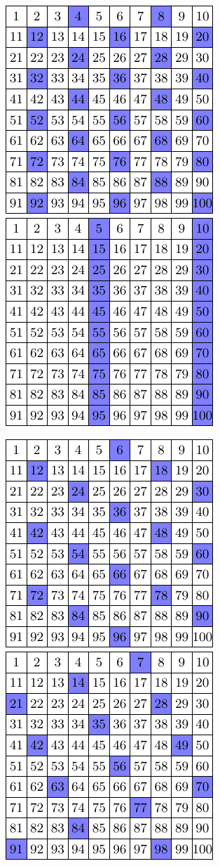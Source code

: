 \begin{center}
	\includegraphics{4} \qquad \qquad
	\includegraphics{5}
\end{center}
\begin{center}
	\includegraphics{6} \qquad \qquad
	\includegraphics{7}
\end{center}
